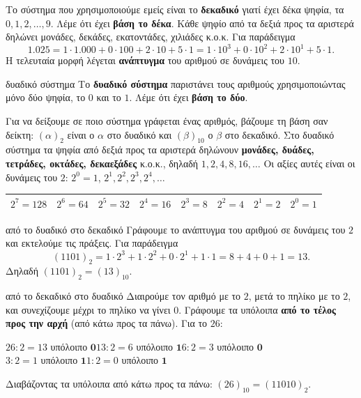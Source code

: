 

Το σύστημα που χρησιμοποιούμε εμείς είναι το \textbf{δεκαδικό} γιατί έχει δέκα ψηφία, τα $0,1,2,\dots,9$. Λέμε ότι έχει \textbf{βάση το δέκα}. Κάθε ψηφίο από τα δεξιά προς τα αριστερά δηλώνει μονάδες, δεκάδες, εκατοντάδες, χιλιάδες κ.ο.κ. Για παράδειγμα
$$1.025=1\cdot 1.000+0\cdot 100+2\cdot 10+5\cdot 1=1\cdot 10^3+0\cdot 10^2+2\cdot 10^1+5\cdot 1.$$
Η τελευταία μορφή λέγεται \textbf{ανάπτυγμα} του αριθμού σε δυνάμεις του $10$.


\begin{orismos}{δυαδικό σύστημα}
Το \textbf{δυαδικό σύστημα} παριστάνει τους αριθμούς χρησιμοποιώντας μόνο δύο ψηφία, το $0$ και το $1$. Λέμε ότι έχει \textbf{βάση το δύο}.
\end{orismos}

Για να δείξουμε σε ποιο σύστημα γράφεται ένας αριθμός, βάζουμε τη βάση σαν δείκτη: $(\alpha)_2$ είναι ο $\alpha$ στο δυαδικό και $(\beta)_{10}$ ο $\beta$ στο δεκαδικό. Στο δυαδικό σύστημα τα ψηφία από δεξιά προς τα αριστερά δηλώνουν \textbf{μονάδες, δυάδες, τετράδες, οκτάδες, δεκαεξάδες} κ.ο.κ., δηλαδή $1,2,4,8,16,\dots$ Οι αξίες αυτές είναι οι δυνάμεις του $2$: $2^0=1$, $2^1,2^2,2^3,2^4,\dots$

\begin{center}
\renewcommand{\arraystretch}{1.5}\setlength{\tabcolsep}{3pt}
\begin{tabular}{|c|c|c|c|c|c|c|c|}\hline
\scriptsize $2^7=128$ & \scriptsize $2^6=64$ & \scriptsize $2^5=32$ & \scriptsize $2^4=16$ & \scriptsize $2^3=8$ & \scriptsize $2^2=4$ & \scriptsize $2^1=2$ & \scriptsize $2^0=1$\\\hline
\end{tabular}
\end{center}

\begin{kanonas}{από το δυαδικό στο δεκαδικό}
Γράφουμε το ανάπτυγμα του αριθμού σε δυνάμεις του $2$ και εκτελούμε τις πράξεις. Για παράδειγμα
$$(1101)_2=1\cdot 2^3+1\cdot 2^2+0\cdot 2^1+1\cdot 1=8+4+0+1=13.$$
Δηλαδή $(1101)_2=(13)_{10}$.
\end{kanonas}

\begin{kanonas}{από το δεκαδικό στο δυαδικό}
Διαιρούμε τον αριθμό με το $2$, μετά το πηλίκο με το $2$, και συνεχίζουμε μέχρι το πηλίκο να γίνει $0$. Γράφουμε τα υπόλοιπα \textbf{από το τέλος προς την αρχή} (από κάτω προς τα πάνω). Για το $26$:
\begin{center}
$26:2=13$ υπόλοιπο $\mathbf{0}$\quad $13:2=6$ υπόλοιπο $\mathbf{1}$\quad $6:2=3$ υπόλοιπο $\mathbf{0}$\\
$3:2=1$ υπόλοιπο $\mathbf{1}$\quad $1:2=0$ υπόλοιπο $\mathbf{1}$
\end{center}
Διαβάζοντας τα υπόλοιπα από κάτω προς τα πάνω: $(26)_{10}=(11010)_2$.
\end{kanonas}


